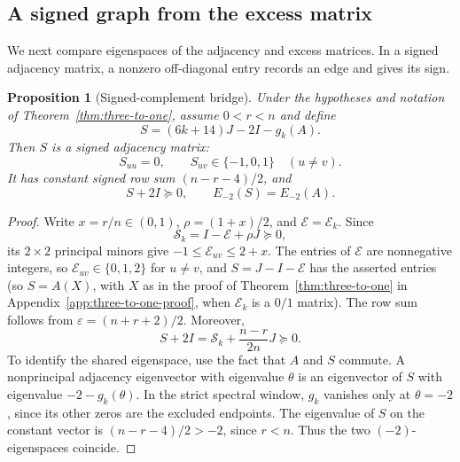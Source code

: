 \documentclass[a4paper,10pt,reqno]{amsart}
\theoremstyle{plain}
\newtheorem{proposition}[theorem]{Proposition}
\theoremstyle{definition}
\theoremstyle{remark}
\begin{document}
\subsection{A signed graph from the excess matrix}

We next compare eigenspaces of the adjacency and excess matrices. In a
signed adjacency matrix, a nonzero off-diagonal entry records an edge and
gives its sign.

\begin{proposition}[Signed-complement bridge]\label{prop:signed-complement}
Under the hypotheses and notation of Theorem~\ref{thm:three-to-one}, assume
\(0<r<n\) and define
\[
 S=(6k+14)J-2I-g_k(A).
\]
Then \(S\) is a signed adjacency matrix:
\[
 S_{uu}=0,\qquad S_{uv}\in\{-1,0,1\}\quad(u\ne v).
\]
It has constant signed row sum \((n-r-4)/2\), and
\[
 S+2I\succeq0,\qquad E_{-2}(S)=E_{-2}(A).
\]
\end{proposition}

\begin{proof}
Write \(x=r/n\in(0,1)\), \(\rho=(1+x)/2\), and
\(\mathcal E=\mathcal E_k\).  Since
\[
 \mathcal S_k=I-\mathcal E+\rho J\succeq0,
\]
its \(2\times2\) principal minors give
\(-1\le\mathcal E_{uv}\le2+x\).  The entries of \(\mathcal E\) are nonnegative
integers, so \(\mathcal E_{uv}\in\{0,1,2\}\) for \(u\ne v\), and
\(S=J-I-\mathcal E\) has the asserted entries (so \(S=A(X)\), with \(X\) as in
the proof of Theorem~\ref{thm:three-to-one} in
Appendix~\ref{app:three-to-one-proof}, when \(\mathcal E_k\) is a
\(0/1\) matrix).  The row sum follows from
\(\varepsilon=(n+r+2)/2\).  Moreover,
\[
 S+2I
 =\mathcal S_k+\frac{n-r}{2n}J\succeq0.
\]
To identify the shared eigenspace, use the fact that \(A\) and \(S\)
commute. A nonprincipal adjacency eigenvector with eigenvalue \(\theta\)
is an eigenvector of \(S\) with eigenvalue \(-2-g_k(\theta)\).
In the strict spectral window, \(g_k\) vanishes only at
\(\theta=-2\), since its other zeros are the excluded endpoints.
The eigenvalue of \(S\) on the constant vector is
\((n-r-4)/2>-2\), since \(r<n\).
Thus the two \((-2)\)-eigenspaces coincide.
\end{proof}
\end{document}
